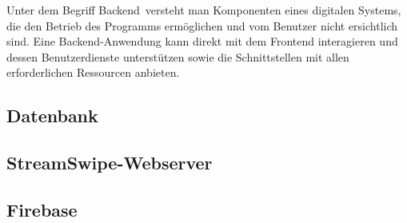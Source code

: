 Unter dem Begriff \glqq Backend\grqq \, versteht man Komponenten eines digitalen Systems, die den Betrieb des Programms ermöglichen und vom Benutzer nicht ersichtlich sind.
\newline
Eine Backend-Anwendung kann direkt mit dem Frontend interagieren und dessen Benutzerdienste unterstützen sowie die Schnittstellen mit allen erforderlichen Ressourcen anbieten.

\subsection{Datenbank}


\subsection{StreamSwipe-Webserver}




\subsection{Firebase}
\label{sec:implementierung_firebase}

